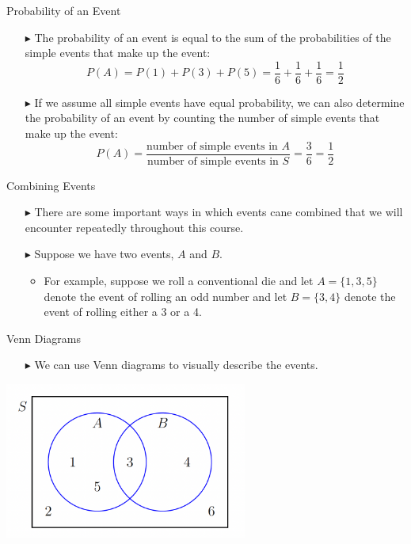 \documentclass[12pt]{beamer}
\begin{document}
\begin{frame}{Probability of an Event}
	\begin{itemize}
		\item[$\blacktriangleright$] The probability of an event is equal to the sum of the probabilities of the simple events that make up the event:
		$$P(A)=P(1)+P(3)+P(5)=\frac{1}{6}+\frac{1}{6}+\frac{1}{6}=\frac{1}{2}$$
		\item[$\blacktriangleright$] If we assume all simple events have equal probability, we can also determine the probability of an event by counting the number of simple events that make up the event:
		$$P(A)=\frac{\text{number of simple events in }A}{\text{number of simple events in }S}=\frac{3}{6}=\frac{1}{2}$$
	\end{itemize}
\end{frame}
\begin{frame}{Combining Events}
	\begin{itemize}
		\item[$\blacktriangleright$] There are some important ways in which events cane combined that we will encounter repeatedly throughout this course.
		\item[$\blacktriangleright$] Suppose we have two events, $A$ and $B$.
		\begin{itemize}
			\item For example, suppose we roll a conventional die and let $A = \{1, 3, 5\}$ denote the event of rolling an odd number and let $B = \{3,4\}$ denote the event of rolling either a 3 or a 4.
		\end{itemize}
	\end{itemize}
\end{frame}
\begin{frame}{Venn Diagrams}
	\begin{itemize}
		\item[$\blacktriangleright$] We can use Venn diagrams to visually describe the events.
	\end{itemize}
	\centering
	\includegraphics[width=8cm]{venn.png}
\end{frame}
\end{document}
